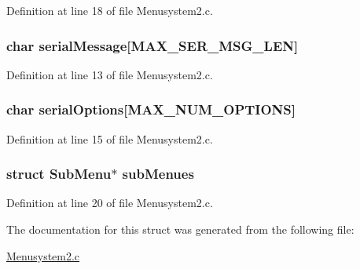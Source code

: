 Definition at line 18 of file Menusystem2.\+c.

\hypertarget{struct_sub_menu_a24706f7b55951b0e21967a256e107936}{
\subsubsection[{serial\+Message}]{\setlength{\rightskip}{0pt plus 5cm}char serial\+Message\mbox{[}{\bf M\+A\+X\+\_\+\+S\+E\+R\+\_\+\+M\+S\+G\+\_\+\+L\+E\+N}\mbox{]}}}\label{struct_sub_menu_a24706f7b55951b0e21967a256e107936}


Definition at line 13 of file Menusystem2.\+c.

\hypertarget{struct_sub_menu_adcfcbb5b5340baf34c70fb8f4cc66f72}{
\subsubsection[{serial\+Options}]{\setlength{\rightskip}{0pt plus 5cm}char serial\+Options\mbox{[}{\bf M\+A\+X\+\_\+\+N\+U\+M\+\_\+\+O\+P\+T\+I\+O\+N\+S}\mbox{]}}}\label{struct_sub_menu_adcfcbb5b5340baf34c70fb8f4cc66f72}


Definition at line 15 of file Menusystem2.\+c.

\hypertarget{struct_sub_menu_a915aa121e09e4c3f914dc59727f390e3}{
\subsubsection[{sub\+Menues}]{\setlength{\rightskip}{0pt plus 5cm}struct {\bf Sub\+Menu}$\ast$ sub\+Menues}}\label{struct_sub_menu_a915aa121e09e4c3f914dc59727f390e3}


Definition at line 20 of file Menusystem2.\+c.



The documentation for this struct was generated from the following file\+:\begin{DoxyCompactItemize}
\item 
\hyperlink{_menusystem2_8c}{Menusystem2.\+c}\end{DoxyCompactItemize}
